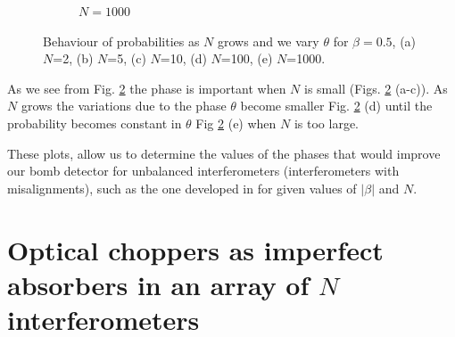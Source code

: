 \documentclass[12pt]{book}
\begin{document}
\begin{figure}[!t]
\begin{subfigure}[b]{0.30\linewidth}
\caption{$N=1000$ }
\label{1000}
\end{subfigure}
\caption{Behaviour of probabilities as $N$ grows and we vary $\theta$ for $\beta=0.5$, (a) $N$=2, (b) $N$=5, (c) $N$=10, (d) $N$=100, (e) $N$=1000.}
\label{con_fase}
\end{figure}

As we see from Fig. \ref{con_fase} the phase is important when $N$ is small (Figs. \ref{con_fase} (a-c)). As $N$  grows the variations due to the phase $\theta$ become smaller Fig. \ref{con_fase} (d) until the probability becomes constant in $\theta$ Fig \ref{con_fase} (e) when $N$ is too large.

These plots, allow us to determine the values of the phases that would improve our bomb detector for unbalanced interferometers (interferometers with misalignments), such as the one developed in \cite{Chao_2018} for given values of $|\beta|$ and $N$.

\section[Optical choppers case]{Optical choppers as imperfect absorbers in  an array of $N$ interferometers}
\end{document}
